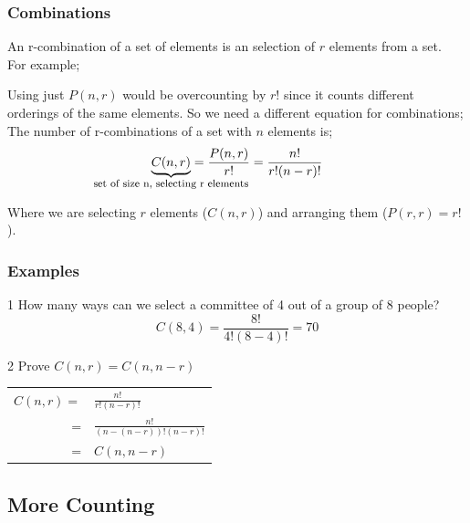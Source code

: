 \documentclass[12pt, letterpaper]{article}
\newcommand{\cul}[1]{%
		\uline{\phantom{#1}}%
		\llap{\contour{white}{#1}}%
	}
\newcommand{\exheader}[1][ex]{{\tiny{#1}\normalsize}}
\newcommand{\intextnote}[1][Also Note Lorem Ipsum]{{
				\emph{
					\begin{small}
					\begin{quote}
						\faInfoCircle\space
						{#1}
					\end{quote}
					\end{small}
		}
	}}
\begin{document}
\pagebreak

\subsubsection{Combinations} 
An r-combination of a set of elements is an \cul{unordered} selection of $r$ elements from a set. \\ 
For example;

\bigbreak

Using just $P(n,r)$ would be overcounting by $r!$ since it counts different orderings of the same elements. So we need a different equation for combinations; \smallbreak
The number of r-combinations of a set with $n$ elements is; 
\[
	\underbrace{C(n,r)}_{\makebox[0pt]{\footnotesize set of size n, selecting r elements}} = \frac{P(n,r)}{r!} = \frac{n!}{r!(n-r)!}
	\]

Where we are selecting $r$ elements ($C(n,r)$) and arranging them ($P(r,r) = r!$).

\bigbreak

\subsubsection*{Examples}

\exheader[1] How many ways can we select a committee of 4 out of a group of 8 people?
\[
	C(8,4) = \frac{8!}{4!(8-4)!} = 70
\]

\bigbreak

\exheader[2] Prove $C(n,r) = C(n, n-r)$ \smallbreak
\begin{tabular}{r l}
	$C(n,r) = $ & $\frac{n!}{r!(n-r)!}$ \\
	= & $\frac{n!}{(n-(n-r))!(n-r)!}$ \\
	= & $C(n,n-r)$
\end{tabular}


\pagebreak

\subsection{More Counting}
\bigbreak
\end{document}
